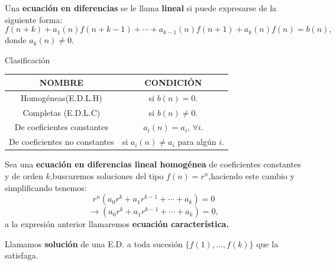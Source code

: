 \begin{frame}
	\begin{definition}
		Una \textbf{ecuación en diferencias} se le llama \textbf{lineal}	  si puede expresarse de la siguiente forma:
		\begin{equation}\label{edl} f\left(n+k\right)+a_{1}(n)f\left(n+k-1\right)+\cdots+a_{k-1}(n)f\left(n+1\right)+a_{k}(n)f\left(n\right)=b\left(n\right), 
		\end{equation}
		donde $a_{k}(n)\neq0$.
	\end{definition}
  \begin{block}{Clasificación}
	\begin{table}[H]
		\centering
	\begin{tabular}{|c|c|}
				\hline
		   \alert{NOMBRE} & \alert{CONDICIÓN}\\
		   \hline
			Homogéneas(E.D.L.H) &si $b(n)=0$.\\
			\hline
			Completas (E.D.L.C) &si $b(n)\neq0$.\\
			\hline
			De coeficientes constantes & $a_{i}(n)=a_{i}$, $\forall i$.\\
			\hline
			De coeficientes no constantes &si $a_{i}(n)\neq a_{i}$ para algún $i$.\\
			\hline
		\end{tabular}
		\end{table}
	\end{block}
\end{frame}
\begin{frame}
\begin{definition}
	Sea una \textbf{ecuación en diferencias lineal homogénea} de coeficientes constantes y de orden $ k $,buscaremos soluciones del tipo  $f(n)=r^{n}$,haciendo este cambio y simplificando  tenemos:
	$$
	r^{n}(a_{0}r^{k}+a_{1}r^{k-1}+\cdots+a_{k})=0
	$$
	$$
	\rightarrow (a_{0}r^{k}+a_{1}r^{k-1}+\cdots+a_{k})=0,
	$$
	a la expresión anterior llamaremos \textbf{ecuación característica.}
\end{definition}
\begin{definition}
	Llamamos \textbf{solución} de una E.D. a toda sucesión $\{ f(1), \ldots, f(k) \}$ que la satisfaga.
\end{definition}

\end{frame}
